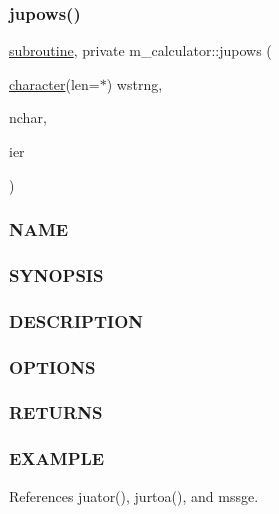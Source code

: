 \subsubsection{\texorpdfstring{jupows()}{jupows()}}
{\footnotesize\ttfamily \hyperlink{M__stopwatch_83_8txt_acfbcff50169d691ff02d4a123ed70482}{subroutine}, private m\+\_\+calculator\+::jupows (\begin{DoxyParamCaption}\item[{\hyperlink{option__stopwatch_83_8txt_abd4b21fbbd175834027b5224bfe97e66}{character}(len=$\ast$)}]{wstrng,  }\item[{}]{nchar,  }\item[{}]{ier }\end{DoxyParamCaption})\hspace{0.3cm}{\ttfamily [private]}}



\subsubsection*{N\+A\+ME}

\subsubsection*{S\+Y\+N\+O\+P\+S\+IS}

\subsubsection*{D\+E\+S\+C\+R\+I\+P\+T\+I\+ON}

\subsubsection*{O\+P\+T\+I\+O\+NS}

\subsubsection*{R\+E\+T\+U\+R\+NS}

\subsubsection*{E\+X\+A\+M\+P\+LE}

References juator(), jurtoa(), and mssge.


